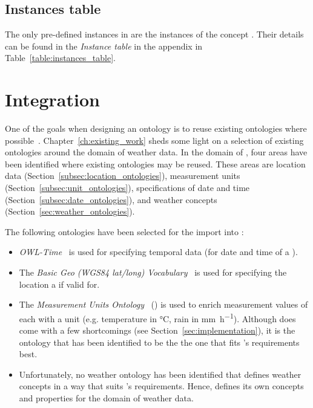 \subsection{Instances table}
\label{subsec:instances_table}

The only pre-defined instances in \smarthomeweather are the instances of the concept . Their details can be found in the \emph{Instance table} in the appendix in Table~\ref{table:instances_table}.

\section{Integration}
\label{sec:integration}

One of the goals when designing an ontology is to reuse existing ontologies where possible~\cite{reuse1,reuse2}. Chapter~\ref{ch:existing_work} sheds some light on a selection of existing ontologies around the domain of weather data. In the domain of \smarthomeweather, four areas have been identified where existing ontologies may be reused. These areas are location data (Section~\ref{subsec:location_ontologies}), measurement units (Section~\ref{subsec:unit_ontologies}), specifications of date and time (Section~\ref{subsec:date_ontologies}), and weather concepts (Section~\ref{sec:weather_ontologies}).

The following ontologies have been selected for the import into \smarthomeweather:
\begin{itemize}
  \item \emph{OWL-Time}~\cite{owl-time} is used for specifying temporal data (for date and time of a ).
  \item The \emph{Basic Geo (WGS84 lat/long) Vocabulary}~\cite{wgs84_vocabulary} is used for specifying the location a  if valid for.
  \item The \emph{Measurement Units Ontology}~\cite{MUO} (\muo) is used to enrich measurement values of each  with a unit (e.g. temperature in \si{\celsius}, rain in \si{\milli\metre\per\hour}). Although \muo does come with a few shortcomings (see Section~\ref{sec:implementation}), it is the ontology that has been identified to be the the one that fits \smarthomeweather's requirements best.
  \item Unfortunately, no weather ontology has been identified that defines weather concepts in a way that suits \smarthomeweather's requirements. Hence, \smarthomeweather defines its own concepts and properties for the domain of weather data.
\end{itemize}

